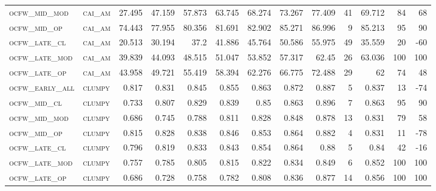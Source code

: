 \begin{landscape}
\begin{center}
\begin{footnotesize}
\begin{longtable}{llrrrrrrrr|rrr}
\textsc{ocfw\_mid\_mod  } & \textsc{cai\_am   }   & 27.495   & 47.159   & 57.873   & 63.745   & 68.274   & 73.267   & 77.409   & 41     & 69.712        & 84            & 68              \\
\textsc{ocfw\_mid\_op   } & \textsc{cai\_am   }   & 74.443   & 77.955   & 80.356   & 81.691   & 82.902   & 85.271   & 86.996   & 9      & 85.213        & 95            & 90              \\
\textsc{ocfw\_late\_cl  } & \textsc{cai\_am   }   & 20.513   & 30.194   & 37.2     & 41.886   & 45.764   & 50.586   & 55.975   & 49     & 35.559        & 20            & -60             \\
\textsc{ocfw\_late\_mod } & \textsc{cai\_am   }   & 39.839   & 44.093   & 48.515   & 51.047   & 53.852   & 57.317   & 62.45    & 26     & 63.036        & 100           & 100             \\
\textsc{ocfw\_late\_op  } & \textsc{cai\_am   }   & 43.958   & 49.721   & 55.419   & 58.394   & 62.276   & 66.775   & 72.488   & 29     & 62            & 74            & 48              \\
\textsc{ocfw\_early\_all} & \textsc{clumpy    }   & 0.817    & 0.831    & 0.845    & 0.855    & 0.863    & 0.872    & 0.887    & 5      & 0.837         & 13            & -74             \\
\textsc{ocfw\_mid\_cl   } & \textsc{clumpy    }   & 0.733    & 0.807    & 0.829    & 0.839    & 0.85     & 0.863    & 0.896    & 7      & 0.863         & 95            & 90              \\
\textsc{ocfw\_mid\_mod  } & \textsc{clumpy    }   & 0.686    & 0.745    & 0.788    & 0.811    & 0.828    & 0.848    & 0.878    & 13     & 0.831         & 79            & 58              \\
\textsc{ocfw\_mid\_op   } & \textsc{clumpy    }   & 0.815    & 0.828    & 0.838    & 0.846    & 0.853    & 0.864    & 0.882    & 4      & 0.831         & 11            & -78             \\
\textsc{ocfw\_late\_cl  } & \textsc{clumpy    }   & 0.796    & 0.819    & 0.833    & 0.843    & 0.854    & 0.864    & 0.88     & 5      & 0.84          & 42            & -16             \\
\textsc{ocfw\_late\_mod } & \textsc{clumpy    }   & 0.757    & 0.785    & 0.805    & 0.815    & 0.822    & 0.834    & 0.849    & 6      & 0.852         & 100           & 100             \\
\textsc{ocfw\_late\_op  } & \textsc{clumpy    }   & 0.686    & 0.728    & 0.758    & 0.782    & 0.808    & 0.836    & 0.877    & 14     & 0.856         & 100           & 100             \\

\end{longtable}
\end{footnotesize}
\end{center}
\end{landscape}
